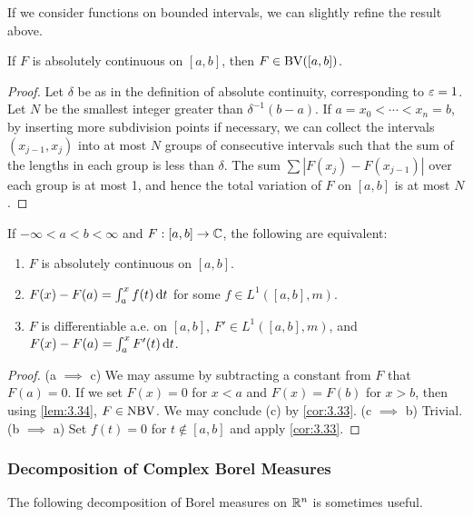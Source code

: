 \documentclass[12pt]{article} %
\begin{document}
If we consider functions on bounded intervals, we can slightly refine the result above.

\begin{lemma}\label{lem:3.34}
    If $F$ is absolutely continuous on $[a, b]$, then $F \in \operatorname{BV}([a, b])$. 
\end{lemma}

\begin{proof}
    Let $\delta$ be as in the definition of absolute continuity, corresponding to $\varepsilon = 1$. Let $N$ be the smallest integer greater than $\delta^{-1}(b-a)$. If $a = x_0 < \cdots < x_n = b$, by inserting more subdivision points if necessary, we can collect the intervals $(x_{j-1}, x_j)$ into at most $N$ groups of consecutive intervals such that the sum of the lengths in each group is less than $\delta$. The sum $\sum |F(x_j) - F(x_{j-1})|$ over each group is at most 1, and hence the total variation of $F$ on $[a,b]$ is at most $N$.
\end{proof}

\begin{theorem}
    If $-\infty < a < b < \infty$ and $F: [a,b] \to \mathbb{C}$, the following are equivalent: \begin{enumerate}
        \item $F$ is absolutely continuous on $[a,b]$.
        \item $F(x) - F(a) = \int_a^x f(t) \, \mathrm{d} t$ for some $f \in L^1([a,b], m)$. 
        \item $F$ is differentiable a.e. on $[a,b]$, $F' \in L^1([a,b], m)$, and $F(x) - F(a) = \int_a^x F'(t) \, \mathrm{d} t$.
    \end{enumerate}
\end{theorem}

\begin{proof}
    (a $\implies$ c) We may assume by subtracting a constant from $F$ that $F(a) = 0$. If we set $F(x) = 0$ for $x < a$ and $F(x) = F(b)$ for $x > b$, then using \cref{lem:3.34}, $F \in \operatorname{NBV}$. We may conclude (c) by \cref{cor:3.33}. (c $\implies$ b) Trivial. (b $\implies$ a) Set $f(t) = 0$ for $t \notin [a,b]$ and apply \cref{cor:3.33}.
\end{proof}

\subsubsection{Decomposition of Complex Borel Measures}

The following decomposition of Borel measures on $\mathbb{R}^n$ is sometimes useful.
\end{document}
